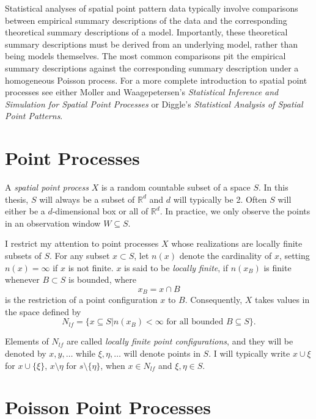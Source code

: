\documentclass[12pt,twoside]{reedthesis}
\begin{document}
  Statistical analyses of spatial point pattern data typically involve
  comparisons between empirical summary descriptions of the data and the
  corresponding theoretical summary descriptions of a model. Importantly,
  these theoretical summary descriptions must be derived from an
  underlying model, rather than being models themselves. The most common
  comparisons pit the empirical summary descriptions against the
  corresponding summary description under a homogeneous Poisson process.
  For a more complete introduction to spatial point processes see either
  Moller and Waagepetersen's \emph{Statistical Inference and Simulation
  for Spatial Point Processes} or Diggle's \emph{Statistical Analysis of
  Spatial Point Patterns}.
  
  \section{Point Processes}\label{point-processes}
  
  A \emph{spatial point process} \(X\) is a random countable subset of a
  space \(S\). In this thesis, \(S\) will always be a subset of
  \(\mathbb{R}^d\) and \(d\) will typically be 2. Often \(S\) will either
  be a \(d\)-dimensional box or all of \(\mathbb{R}^d\). In practice, we
  only observe the points in an observation window \(W\subseteq S\).
  
  I restrict my attention to point processes \(X\) whose realizations are
  locally finite subsets of \(S\). For any subset \(x\subset S\), let
  \(n(x)\) denote the cardinality of \(x\), setting \(n(x) = \infty\) if
  \(x\) is not finite. \(x\) is said to be \emph{locally finite}, if
  \(n(x_B)\) is finite whenever \(B\subset S\) is bounded, where
  \[x_B = x \cap B \] is the restriction of a point configuration \(x\) to
  \(B\). Consequently, \(X\) takes values in the space defined by
  \[N_{lf} = \{ x\subseteq S | n(x_B) < \infty \text{ for all bounded } B\subseteq S \}.\]
  
  Elements of \(N_{lf}\) are called \emph{locally finite point
  configurations}, and they will be denoted by \(x, y, \dots\) while
  \(\xi, \eta, \dots\) will denote points in \(S\). I will typically write
  \(x\cup \xi\) for \(x\cup \{ \xi \}\), \(x\setminus \eta\) for
  \(s\setminus \{\eta\}\), when \(x\in N_{lf}\) and \(\xi, \eta \in S\).
  
  \section{Poisson Point Processes}\label{poisson-point-processes}
  
\end{document}
